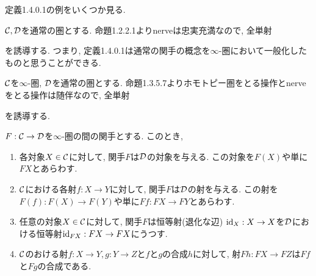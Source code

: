\documentclass[uplatex, a4paper, 14Q, dvipdfmx]{jsreport}
\begin{document}
定義1.4.0.1の例をいくつか見る. 

\begin{example}
  $\mathcal{C},\mathcal{D}$を通常の圏とする. 
  命題1.2.2.1よりnerveは忠実充満なので, 全単射
  \begin{center}
  \end{center}
  を誘導する.
  つまり, 定義1.4.0.1は通常の関手の概念を$\infty$-圏において一般化したものと思うことができる. 
\end{example}

\begin{example}
  $\mathcal{C}$を$\infty$-圏, $\mathcal{D}$を通常の圏とする. 
  命題1.3.5.7よりホモトピー圏をとる操作とnerveをとる操作は随伴なので, 全単射
  \begin{center}
  \end{center}
  を誘導する. 
\end{example}

\begin{remark}
  $F: \mathcal{C} \to \mathcal{D}$を$\infty$-圏の間の関手とする. 
  このとき, 
  \begin{enumerate}
    \item 
    各対象$X \in \mathcal{C}$に対して, 関手$F$は$\mathcal{D}$の対象を与える. 
    この対象を$F(X)$や単に$FX$とあらわす. 
    \item 
    $\mathcal{C}$における各射$f: X \to Y$に対して, 関手$F$は$\mathcal{D}$の射を与える. 
    この射を$F(f): F(X) \to F(Y)$や単に$Ff: FX \to FY$とあらわす. 
    \item 
    任意の対象$X \in \mathcal{C}$に対して, 関手$F$は恒等射(退化な辺) $\mathrm{id}_X: X \to X$を$\mathcal{D}$における恒等射$\mathrm{id}_{FX}: FX \to FX$にうつす. 
    \item 
    $\mathcal{C}$のおける射$f: X \to Y, g: Y \to Z$と$f$と$g$の合成$h$に対して, 射$Fh: FX \to FZ$は$Ff$と$Fg$の合成である. 
  \end{enumerate}
\end{remark}
\end{document}
